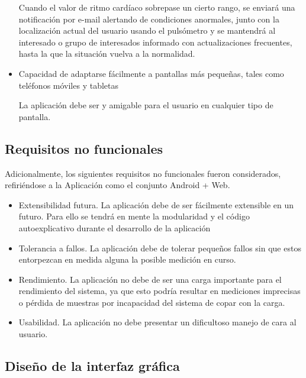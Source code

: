 \begin{itemize}
Cuando el valor de ritmo cardíaco sobrepase un cierto rango, se enviará una notificación por e-mail alertando de condiciones anormales, junto con la localización actual del usuario usando el pulsómetro y se mantendrá al interesado o grupo de interesados informado con actualizaciones frecuentes, hasta la que la situación vuelva a la normalidad.

\item Capacidad de adaptarse fácilmente a pantallas más pequeñas, tales como teléfonos móviles y tabletas

La aplicación debe ser  y amigable para el usuario en cualquier tipo de pantalla.
 
\end{itemize}

\subsection{Requisitos no funcionales}

Adicionalmente, los siguientes requisitos no funcionales fueron considerados, refiriéndose a la Aplicación como el conjunto Android + Web.

\begin{itemize}
\item Extensibilidad futura.
La aplicación debe de ser fácilmente extensible en un futuro. Para ello se tendrá en mente la modularidad y el código autoexplicativo durante el desarrollo de la aplicación 

\item Tolerancia a fallos.
La aplicación debe de tolerar pequeños fallos sin que estos entorpezcan en medida alguna la posible medición en curso.

\item Rendimiento.
La aplicación no debe de ser una carga importante para el rendimiento del sistema, ya que esto podría resultar en mediciones imprecisas o pérdida de muestras por incapacidad del sistema de copar con la carga.

\item Usabilidad.
La aplicación no debe presentar un dificultoso manejo de cara al usuario.

\end{itemize}

\subsection{Diseño de la interfaz gráfica}

